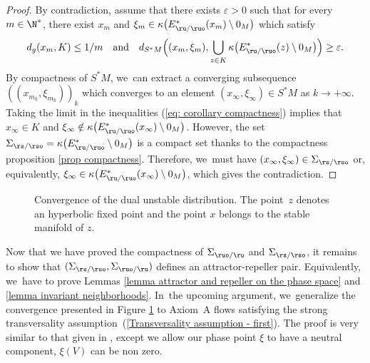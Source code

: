\begin{proof}
By contradiction, assume that there exists $\varepsilon > 0$ such that for every $m \in \N^*$, there exist $x_m$ and $\xi_m \in \kappa \bigl(E_{\ru/\ruo}^* (x_m) \setminus 0_M \bigr)$ which satisfy\vspace*{-3pt}
\begin{equation}\label{eq: corollary compactness}
d_g (x_m, K) \leq 1/m \quad \text{and} \quad d_{S^* M} \Bigl((x_m,\xi_m), \bigcup_{z \in K} \kappa\bigl(E_{\ru/\ruo}^* (z)\setminus 0_M \bigr) \Bigr) \geq \varepsilon.
\end{equation}
By compactness of $S^* M$, we~can extract a converging subsequence $((x_{m_k},\xi_{m_k}))_k$ which converges to an element $(x_{\infty},\xi_{\infty}) \in S^* M$ as $k \to + \infty$. Taking the limit in the inequalities (\ref{eq: corollary compactness}) implies that $x_{\infty} \in K$ and $\xi_{\infty} \notin \kappa \bigl(E_{\ru/\ruo}^* (x_{\infty}) \setminus 0_M \bigr)$. However, the set $\Sigma_{\rs/\rso} = \kappa \bigl(E_{\ru/\ruo}^* \setminus 0_M \bigr)$ is a compact set thanks to the compactness proposition \ref{prop compactness}. Therefore, we~must have $(x_{\infty},\xi_{\infty}) \in \Sigma_{\rs/\rso}$ or, equivalently, $\xi_{\infty} \in \kappa \bigl(E_{\ru/\ruo}^* (x_{\infty}) \setminus 0_M \bigr)$, which gives the contradiction.
\end{proof}

\label{subsection: proof Lemma attracting and repelling sets for the Hamiltonian flow}

\begin{figure}[!t]
\centering
\def\svgscale{1.1}

\caption{Convergence of the dual unstable distribution. The point~$z$ denotes an hyperbolic fixed point and the point $x$ belongs to the stable manifold of $z$.}
\label{fig: cv of dual distribution for Morse-Smale gradient flows}
\end{figure}

Now that we have proved the compactness of $\Sigma_{\ruo/\ru}$ and $\Sigma_{\rs/\rso}$, it remains to show that $(\Sigma_{\rs/\rso}, \Sigma_{\ruo/\ru})$ defines an attractor-repeller pair. Equivalently, we~have to prove Lemmas \ref{lemma attractor and repeller on the phase space} and \ref{lemma invariant neighborhoods}. In~the upcoming argument, we~generalize the convergence presented in Figure \ref{fig: cv of dual distribution for Morse-Smale gradient flows} to Axiom~A flows satisfying the strong transversality assumption~(\ref{Transversality assumption - first}). The proof is very similar to that given in \cite[Lem.\,2.10\,(4), p.\,13]{dyatlov-guillarmou_2016}, except we allow our phase point $\xi$ to have a neutral component, \ie $\xi (V)$ can be non zero.

